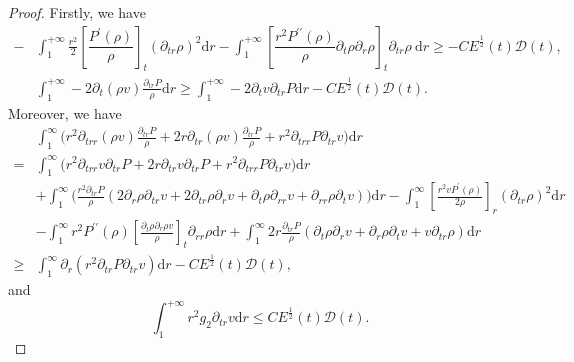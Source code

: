 \documentclass[10pt,a4paper]{amsart}
\begin{document}
\begin{proof}
		Firstly, we have
		\begin{equation}\nonumber
			\begin{aligned}
				-&\int_{1}^{+\infty}\frac{r^2}{2}[\dfrac{ P^{\prime}(\rho)}{\rho}]_t\left(\partial_{tr} \rho\right)^2\mathrm{d}r
				-\int_{1}^{+\infty} [\dfrac{r^2 P^{\prime\prime}(\rho)}{\rho} \partial_{t}\rho\partial_{r}\rho]_t\partial_{tr}\rho\mathrm{~d}r
				\geq -C E^{\frac{1}{2}}(t) \mathcal{D}(t),\\
				&\int_{1}^{+\infty}-2\partial_{t} (\rho v) \frac{\partial_{tr}P}{\rho}\mathrm{d}r
				\geq \int_{1}^{+\infty}-2\partial_{t}v\partial_{tr}P\mathrm{d}r
				-C E^{\frac{1}{2}}(t) \mathcal{D}(t).
			\end{aligned}
		\end{equation}
		Moreover, we have
		\begin{equation}\nonumber
			\begin{aligned}
				&\int_{1}^{\infty}\bigg(r^2\partial_{trr}\left(\rho v\right) \frac{\partial_{tr}P}{\rho}
				+2r \partial_{tr} (\rho v) \frac{\partial_{tr}P}{\rho}
				+r^2 \partial_{trr}P \partial_{tr}v\bigg)\mathrm{d}r\\
				=&\int_{1}^{\infty}\bigg(r^2\partial_{trr}v \partial_{tr}P+2r \partial_{tr} v \partial_{tr}P
				+r^2 \partial_{trr}P \partial_{tr}v\bigg)\mathrm{d}r\\
				&+\int_{1}^{\infty}\bigg(\frac{r^2\partial_{tr}P}{\rho}(2\partial_{r}\rho \partial_{tr} v+2\partial_{tr}\rho \partial_{r} v+\partial_{t}\rho \partial_{rr} v+\partial_{rr}\rho \partial_{t} v)\bigg)\mathrm{d}r
				-\int_{1}^{\infty}[\frac{r^2vP^{\prime}(\rho)}{2\rho}]_r(\partial_{tr}\rho)^2\mathrm{d}r\\
				&
				-\int_{1}^{\infty}r^2P^{\prime\prime}(\rho)[\frac{\partial_{t}\rho\partial_{r}\rho v}{\rho}]_t \partial_{rr}\rho\mathrm{d}r
				+\int_{1}^{\infty}2r \frac{\partial_{tr}P}{\rho}(\partial_{t}\rho \partial_{r} v+\partial_{r}\rho \partial_{t} v+v \partial_{tr}\rho)\mathrm{d} r\\
				\geq& \int_{1}^{\infty}\partial_{r}\left(r^2\partial_{tr}P\partial_{tr}v\right)\mathrm{d}r -C E^{\frac{1}{2}}(t) \mathcal{D}(t),
			\end{aligned}
		\end{equation}
		and
		\begin{equation}\nonumber
			\int_{1}^{+\infty}r^2g_2 \partial_{tr}v\mathrm{d}r\leq C E^{\frac{1}{2}}(t) \mathcal{D}(t).
		\end{equation}
		

\end{proof}
\end{document}
